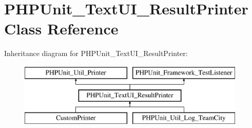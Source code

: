 \hypertarget{class_p_h_p_unit___text_u_i___result_printer}{}\section{P\+H\+P\+Unit\+\_\+\+Text\+U\+I\+\_\+\+Result\+Printer Class Reference}
\label{class_p_h_p_unit___text_u_i___result_printer}
Inheritance diagram for P\+H\+P\+Unit\+\_\+\+Text\+U\+I\+\_\+\+Result\+Printer\+:\begin{figure}[H]
\begin{center}
\leavevmode
\includegraphics[height=3.000000cm]{class_p_h_p_unit___text_u_i___result_printer}
\end{center}
\end{figure}
